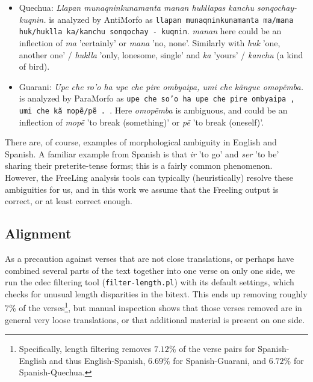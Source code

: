 \begin{figure*}
\begin{itemize}
  \item Quechua: \emph{Llapan munaqninkunamanta manan hukllapas kanchu
  sonqochay- kuqnin.} is analyzed by AntiMorfo as \texttt{llapan
  munaqninkunamanta ma/mana huk/huklla ka/kanchu sonqochay - kuqnin}.
  \emph{manan} here could be an inflection of \emph{ma} 'certainly' or
  \emph{mana} 'no, none'. Similarly with \emph{huk} 'one, another one' /
  \emph{huklla} 'only, lonesome, single' and \emph{ka} 'yours' /
  \emph{kanchu} (a kind of bird).
  \item Guarani: \emph{Upe che ro'o ha upe che pire ombyaipa, umi che kãngue
  omopẽmba.} is analyzed by ParaMorfo as \texttt{upe
  che so'o ha upe che pire ombyaipa , umi che kã mopẽ/pẽ . }. Here
  \emph{omopẽmba} is ambiguous, and could be an inflection of \emph{mopẽ} 'to
  break (something)' or \emph{pẽ} 'to break (oneself)'.
\end{itemize}
\caption{Examples of morphological ambiguity in Quechua and Guarani,
having been run through AntiMorfo and ParaMorfo. The Quechua text is the first
sentence of Lamentations 1:2; the Guarani is Lamentations 3:4.}
\label{fig:gn-qu-morpho-ambiguity}
\end{figure*}


There are, of course, examples of morphological ambiguity in English and
Spanish. A familiar example from Spanish is that \emph{ir} 'to
go' and \emph{ser} 'to be' sharing their preterite-tense forms; this is a
fairly common phenomenon. However, the FreeLing analysis tools can typically
(heuristically) resolve these ambiguities for us, and in this work we assume
that the Freeling output is correct, or at least correct enough.

\subsection{Alignment}
As a precaution against verses that are not close translations, or perhaps have
combined several parts of the text together into one verse on only one side, we
run the cdec filtering tool (\texttt{filter-length.pl}) with its default
settings, which checks for unusual length disparities in the bitext. This ends
up removing roughly 7\% of the verses\footnote{Specifically, length filtering
removes $7.12\%$ of the verse pairs for Spanish-English and thus
English-Spanish, $6.69\%$ for Spanish-Guarani, and $6.72\%$ for
Spanish-Quechua.}, but manual inspection shows that those verses removed are in
general very loose translations, or that additional material is present on one
side.

